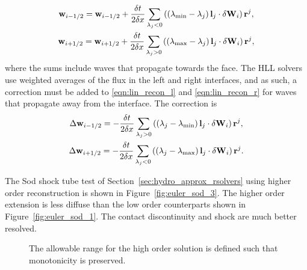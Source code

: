 \begin{gather}
\label{eqn:lin_recon_l}
\mathbf{w}_{i-1/2} = \mathbf{w}_{i-1/2} + \frac{\delta t}{2\delta x} \sum_{\lambda_j < 0} 
                 \left(\left(\lambda_{\min} - \lambda_j\right) \mathbf{l}_j 
                 \cdot \mathbf{\delta} \mathbf{W}_i\right) \mathbf{r}^j, \\
\label{eqn:lin_recon_r}
\mathbf{w}_{i+1/2} = \mathbf{w}_{i+1/2} + \frac{\delta t}{2\delta x} \sum_{\lambda_j > 0} 
                 \left(\left(\lambda_{\max} - \lambda_j\right) \mathbf{l}_j 
                 \cdot \mathbf{\delta} \mathbf{W}_i\right) \mathbf{r}^j, 
\end{gather}
where the sums include waves that propagate towards the face.  The HLL solvers use weighted averages of the flux in the left and right interfaces, and as such, a correction must be added to \eqref{eqn:lin_recon_l} and \eqref{eqn:lin_recon_r} for waves that propagate away from the interface.  The correction is \citep{Colella:1984}
\begin{gather}
\Delta \mathbf{w}_{i-1/2} = -\frac{\delta t}{2\delta x} \sum_{\lambda_j > 0} 
                 \left(\left(\lambda_j - \lambda_{\min}\right) \mathbf{l}_j 
                 \cdot \mathbf{\delta} \mathbf{W}_i\right) \mathbf{r}^j, \\
\Delta \mathbf{w}_{i+1/2} = -\frac{\delta t}{2\delta x} \sum_{\lambda_j < 0} 
                 \left(\left(\lambda_j - \lambda_{\max}\right) \mathbf{l}_j 
                 \cdot \mathbf{\delta} \mathbf{W}_i\right) \mathbf{r}^j. 
\end{gather}

The Sod shock tube test of Section~\ref{sec:hydro_approx_rsolvers} using higher order reconstruction is shown in Figure~\ref{fig:euler_sod_3}.  The higher order extension is less diffuse than the low order counterparts shown in Figure~\ref{fig:euler_sod_1}.  The contact discontinuity and shock are much better resolved.

\begin{figure}[htbp]\figSpace
\begin{center}

\end{center}
\caption{The allowable range for the high order solution is defined such that monotonicity is preserved.}
\label{fig:interface_fct}
\figSpace
\end{figure}

